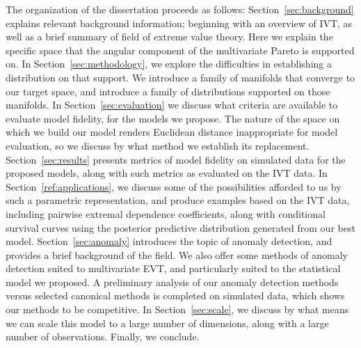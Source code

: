 The organization of the dissertation proceeds as follows:
  Section~\ref{sec:background} explains relevant background information; beginning with an overview of
  IVT, as well as a brief summary of field of extreme value theory.  Here we explain the specific space
  that the angular component of the multivariate Pareto is supported on. In Section~\ref{sec:methodology},
  we explore the difficulties in establishing a distribution on that support.  We introduce a family of
  manifolds that converge to our target space, and introduce a family of distributions supported on those
  manifolds.  In Section~\ref{sec:evaluation} we discuss what criteria are available to evaluate model
  fidelity, for the models we propose.  The nature of the space on which we build our model renders Euclidean
  distance inappropriate for model evaluation, so we discuss by what method we establish its replacement.
  Section~\ref{sec:results} presents metrics of model fidelity on simulated data for the proposed models,
  along with such metrics as evaluated on the IVT data.  In Section~\ref{ref:applications}, we discuss
  some of the possibilities afforded to us by such a parametric representation, and produce examples
  based on the IVT data, including pairwise extremal dependence coefficients, along with conditional
  survival curves using the posterior predictive distribution generated from our best model.
  Section~\ref{sec:anomaly} introduces the topic of anomaly detection, and provides a brief background
  of the field.  We also offer some methods of anomaly detection suited to multivariate EVT, and
  particularly suited to the statistical model we proposed. A preliminary analysis of our anomaly
  detection methods versus selected canonical methods is completed on simulated data, which shows
  our methods to be competitive.  In Section~\ref{sec:scale}, we discuss by what means we can scale
  this model to a large number of dimensions, along with a large number of observations.  Finally, we
  conclude.



















